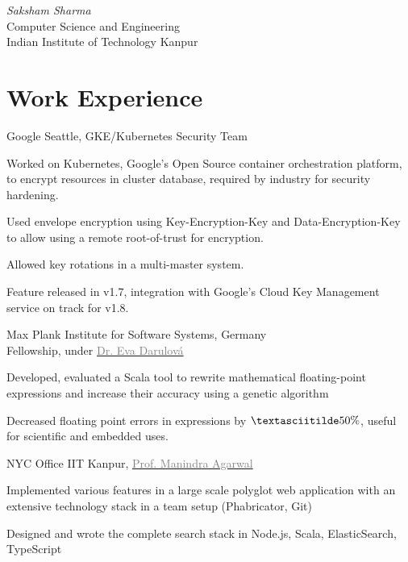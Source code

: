 \documentclass{tccv}
\begin{document}
{ \textit{Saksham \textcolor{myred}{Sharma}}}
\medskip\\
\large{Computer Science and Engineering}\\
{Indian Institute of Technology Kanpur}

\vspace{-0.5cm}
\section{Work Experience}
\begin{experience}
  {Google Seattle, GKE/Kubernetes Security Team}
  {
  \item Worked on Kubernetes, Google's Open Source container orchestration platform, to
    encrypt resources in cluster database, required by industry for security hardening.
  \item Used envelope encryption using Key-Encryption-Key and Data-Encryption-Key to allow
    using a remote root-of-trust for encryption.
  \item Allowed key rotations in a multi-master system.
  \item Feature released in v1.7, integration with Google's Cloud Key Management service
    on track for v1.8.
  }

  {Max Plank Institute for Software Systems, \small{Germany}\\
  Fellowship, under
  \href{http://www.mpi-sws.org/~eva}{\textcolor{gray}{Dr. Eva
      Darulová}}}
  {
  \item Developed, evaluated a Scala tool to rewrite
    mathematical floating-point expressions and increase their
    accuracy using a genetic algorithm
  \item Decreased floating point errors in expressions by
    $\textasciitilde50\%$, useful for scientific and embedded uses.
  }

  {NYC Office IIT Kanpur,
    \href{http://cse.iitk.ac.in/~manindra}{\textcolor{gray}{Prof. Manindra Agarwal}}}
  {
  \item Implemented various features in a large scale polyglot web
    application with an extensive technology stack in a team setup
    (Phabricator, Git)
  \item Designed and wrote the complete search stack in Node.js, Scala, ElasticSearch, TypeScript
  }
\end{experience}
\end{document}
